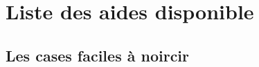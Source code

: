 
\newcommand{\titre}{{\Huge Manuel Aide}\\Groupe B}
\newcommand{\titrehead}{Aide}






\chapter{Liste des aides disponible}


\section{Les cases faciles à noircir}
	\paragraph{}
